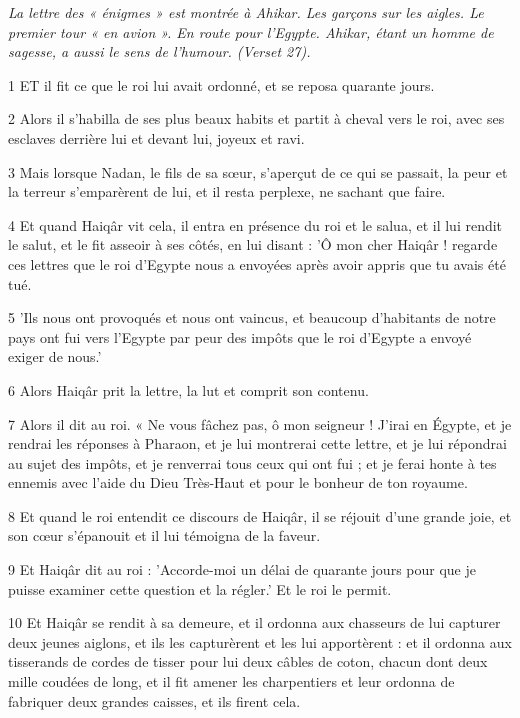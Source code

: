 \par \textit{La lettre des « énigmes » est montrée à Ahikar. Les garçons sur les aigles. Le premier tour « en avion ». En route pour l'Egypte. Ahikar, étant un homme de sagesse, a aussi le sens de l'humour. (Verset 27).}

\par 1 ET il fit ce que le roi lui avait ordonné, et se reposa quarante jours.

\par 2 Alors il s'habilla de ses plus beaux habits et partit à cheval vers le roi, avec ses esclaves derrière lui et devant lui, joyeux et ravi.

\par 3 Mais lorsque Nadan, le fils de sa sœur, s'aperçut de ce qui se passait, la peur et la terreur s'emparèrent de lui, et il resta perplexe, ne sachant que faire.

\par 4 Et quand Haiqâr vit cela, il entra en présence du roi et le salua, et il lui rendit le salut, et le fit asseoir à ses côtés, en lui disant : 'Ô mon cher Haiqâr ! regarde ces lettres que le roi d'Egypte nous a envoyées après avoir appris que tu avais été tué.

\par 5 'Ils nous ont provoqués et nous ont vaincus, et beaucoup d'habitants de notre pays ont fui vers l'Egypte par peur des impôts que le roi d'Egypte a envoyé exiger de nous.'

\par 6 Alors Haiqâr prit la lettre, la lut et comprit son contenu.

\par 7 Alors il dit au roi. « Ne vous fâchez pas, ô mon seigneur ! J'irai en Égypte, et je rendrai les réponses à Pharaon, et je lui montrerai cette lettre, et je lui répondrai au sujet des impôts, et je renverrai tous ceux qui ont fui ; et je ferai honte à tes ennemis avec l'aide du Dieu Très-Haut et pour le bonheur de ton royaume.

\par 8 Et quand le roi entendit ce discours de Haiqâr, il se réjouit d'une grande joie, et son cœur s'épanouit et il lui témoigna de la faveur.

\par 9 Et Haiqâr dit au roi : 'Accorde-moi un délai de quarante jours pour que je puisse examiner cette question et la régler.' Et le roi le permit.

\par 10 Et Haiqâr se rendit à sa demeure, et il ordonna aux chasseurs de lui capturer deux jeunes aiglons, et ils les capturèrent et les lui apportèrent : et il ordonna aux tisserands de cordes de tisser pour lui deux câbles de coton, chacun dont deux mille coudées de long, et il fit amener les charpentiers et leur ordonna de fabriquer deux grandes caisses, et ils firent cela.

